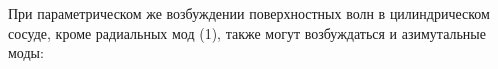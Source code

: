 
%
%
%
%
%
%
%
При параметрическом же возбуждении поверхностных волн в цилиндрическом сосуде, кроме радиальных мод (1), также могут возбуждаться и азимутальные моды:
%
